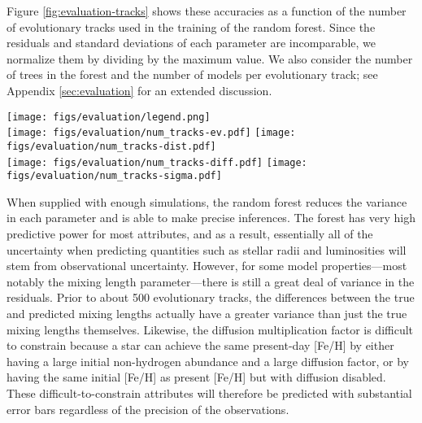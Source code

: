 \documentclass[twocolumn,twocolappendix]{aastex6}
\begin{document}
Figure \ref{fig:evaluation-tracks} shows these accuracies as a function of the number of evolutionary tracks used in the training of the random forest. Since the residuals and standard deviations of each parameter are incomparable, we normalize them by dividing by the maximum value. %
We also consider the number of trees in the forest and the number of models per evolutionary track; see Appendix \ref{sec:evaluation} for an extended discussion.

\begin{figure*}
    \centering
    \texttt{[image: figs/evaluation/legend.png]}\\
    \texttt{[image: figs/evaluation/num\_tracks-ev.pdf]}\hfill
    \texttt{[image: figs/evaluation/num\_tracks-dist.pdf]}\\
    \texttt{[image: figs/evaluation/num\_tracks-diff.pdf]}\hfill
    \texttt{[image: figs/evaluation/num\_tracks-sigma.pdf]}\\
    \caption{Evaluations of regression accuracy. Explained variance (top left), accuracy per precision distance (top right), normalized absolute error (bottom left), and normalized uncertainty (bottom right) for each stellar parameter as a function of the number of evolutionary tracks used in training the random forest. These results use 64 models per track and 256 trees in the random forest. } 
    \label{fig:evaluation-tracks}
\end{figure*}

When supplied with enough simulations, the random forest reduces the variance in each parameter and is able to make precise inferences. The forest has very high predictive power for most attributes, and as a result, essentially all of the uncertainty when predicting quantities such as stellar radii and luminosities will stem from observational uncertainty. However, for some model properties---most notably the mixing length parameter---there is still a great deal of variance in the residuals. Prior to about 500 evolutionary tracks, the differences between the true and predicted mixing lengths actually have a greater variance than just the true mixing lengths themselves. Likewise, the diffusion multiplication factor is difficult to constrain because a star can achieve the same present-day [Fe/H] by either having a large initial non-hydrogen abundance and a large diffusion factor, or by having the same initial [Fe/H] as present [Fe/H] but with diffusion disabled. These difficult-to-constrain attributes will therefore be predicted with substantial error bars regardless of the precision of the observations. 
\end{document}
